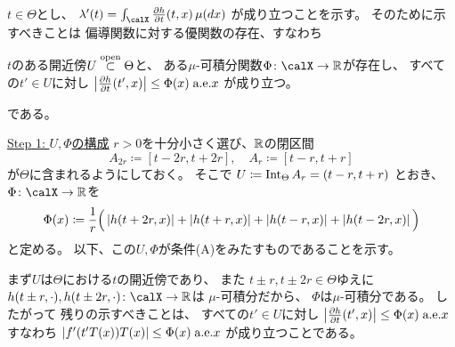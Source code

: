 \documentclass[report]{jlreq}
\begin{document}
\begin{answer}
    $t \in \Theta$とし、
    $\lambda'(t) = \int_\calX \deldel[h]{t} (t, x) \, \mu(dx)$
    が成り立つことを示す。
    そのために示すべきことは
    偏導関数に対する優関数の存在、すなわち
    \begin{description}
        \vspace{-1em}
        \item[(A)] $t$のある開近傍$U \stackrel{\text{open}}{\subset} \Theta$と、
            ある$\mu$-可積分関数$\Phi \colon \calX \to \R$が存在し、
            すべての$t' \in U$に対し
            $\myabs{
                \deldel[h]{t}(t', x)
            } \le \Phi(x) \; \text{a.e.$x$}$
            が成り立つ。
    \end{description}
    である。

    \uline{Step 1: $U, \Phi$の構成} \quad
    $r > 0$を十分小さく選び、$\mathbb{R}$の閉区間
    \begin{equation}
        A_{2r} \coloneqq [t - 2r, t + 2r],
            \quad
            A_r \coloneqq [t - r, t + r]
    \end{equation}
    が$\Theta$に含まれるようにしておく。
    そこで
    $U \coloneqq \operatorname{Int}_\Theta A_r = (t - r, t + r)$
    とおき、
    $\Phi \colon \calX \to \R$を
    \begin{equation}
        \Phi(x)
            \coloneqq
                \frac{1}{r}
                \Big(
                    \left|{
                        h(t + 2r, x)
                    }\right|
                    +
                    \left|{
                        h(t + r, x)
                    }\right|
                    +
                    \left|{
                        h(t - r, x)
                    }\right|
                    +
                    \left|{
                        h(t - 2r, x)
                    }\right|
                \Big)
    \end{equation}
    と定める。
    以下、この$U, \Phi$が条件(A)をみたすものであることを示す。

    まず$U$は$\Theta$における$t$の開近傍であり、
    また
    $t \pm r, t \pm 2r \in \Theta$ゆえに
    $h(t \pm r, \cdot), h(t \pm 2r, \cdot) \colon \calX \to \R$は
    $\mu$-可積分だから、
    $\Phi$は$\mu$-可積分である。
    したがって
    残りの示すべきことは、
    すべての$t' \in U$に対し
    $\myabs{
        \deldel[h]{t}(t', x)
    }
        \le \Phi(x) \; \text{a.e.$x$}$
    すなわち
    $\left|{
        f'(t'T(x)) T(x)
    }\right|
        \le \Phi(x) \; \text{a.e.$x$}$
    が成り立つことである。


\end{answer}
\end{document}
